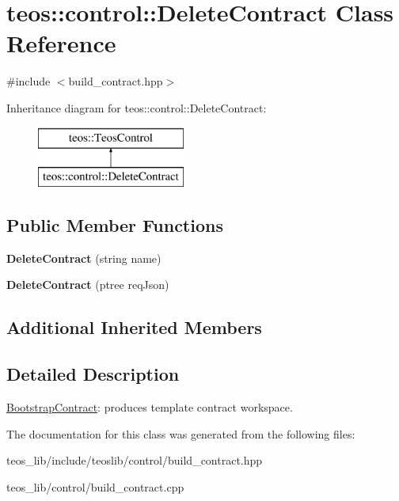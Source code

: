 \hypertarget{classteos_1_1control_1_1_delete_contract}{}\section{teos\+:\+:control\+:\+:Delete\+Contract Class Reference}
\label{classteos_1_1control_1_1_delete_contract}


{\ttfamily \#include $<$build\+\_\+contract.\+hpp$>$}

Inheritance diagram for teos\+:\+:control\+:\+:Delete\+Contract\+:\begin{figure}[H]
\begin{center}
\leavevmode
\includegraphics[height=2.000000cm]{classteos_1_1control_1_1_delete_contract}
\end{center}
\end{figure}
\subsection*{Public Member Functions}
\begin{DoxyCompactItemize}
\item 
\mbox{\label{classteos_1_1control_1_1_delete_contract_a9f91d7395f390ff68db2417d73be8c35}} 
{\bfseries Delete\+Contract} (string name)
\item 
\mbox{\label{classteos_1_1control_1_1_delete_contract_ac519ac86917200febf0195a4d2ce60ab}} 
{\bfseries Delete\+Contract} (ptree req\+Json)
\end{DoxyCompactItemize}
\subsection*{Additional Inherited Members}


\subsection{Detailed Description}
\mbox{\hyperlink{classteos_1_1control_1_1_bootstrap_contract}{Bootstrap\+Contract}}\+: produces template contract workspace. 

The documentation for this class was generated from the following files\+:\begin{DoxyCompactItemize}
\item 
teos\+\_\+lib/include/teoslib/control/build\+\_\+contract.\+hpp\item 
teos\+\_\+lib/control/build\+\_\+contract.\+cpp\end{DoxyCompactItemize}
